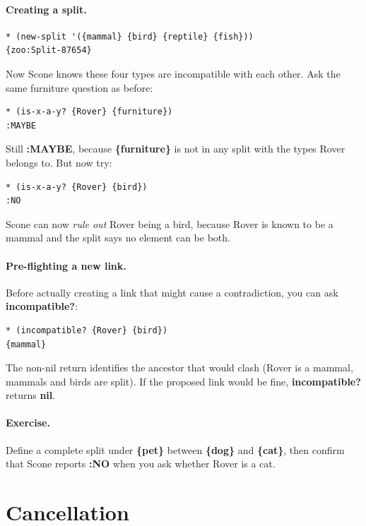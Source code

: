 \documentclass[titlepage,twoside,openright,11pt]{article}
\begin{document}
\paragraph{Creating a split.}

\begin{verbatim}
* (new-split '({mammal} {bird} {reptile} {fish}))
{zoo:Split-87654}
\end{verbatim}

Now Scone knows these four types are incompatible with each other.
Ask the same furniture question as before:

\begin{verbatim}
* (is-x-a-y? {Rover} {furniture})
:MAYBE
\end{verbatim}

Still \textbf{:MAYBE}, because \textbf{\{furniture\}} is not in any
split with the types Rover belongs to. But now try:

\begin{verbatim}
* (is-x-a-y? {Rover} {bird})
:NO
\end{verbatim}

Scone can now \emph{rule out} Rover being a bird, because Rover
is known to be a mammal and the split says no element can be both.

\paragraph{Pre-flighting a new link.}
Before actually creating a link that might cause a contradiction,
you can ask \textbf{incompatible?}:

\begin{verbatim}
* (incompatible? {Rover} {bird})
{mammal}
\end{verbatim}

The non-nil return identifies the ancestor that would clash (Rover
is a mammal, mammals and birds are split). If the proposed link
would be fine, \textbf{incompatible?} returns \textbf{nil}.

\paragraph{Exercise.}
Define a complete split under \textbf{\{pet\}} between
\textbf{\{dog\}} and \textbf{\{cat\}}, then confirm that Scone
reports \textbf{:NO} when you ask whether Rover is a cat.

\section{Cancellation}\label{cancellation}
\end{document}
